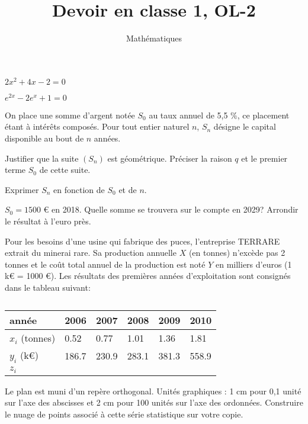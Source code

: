 \documentclass[a4paper,12pt]{scrartcl}
\date{}
\title{Devoir en classe 1, OL-2}
\author{Mathématiques}
\begin{document}
\maketitle


\question{}
$2x^2 +4x - 2 = 0$

\question{}
$e^{2x} - 2e^x + 1 = 0$


On place une somme d'argent notée $S_0$ au taux annuel de 5,5 \%, ce placement étant à intérêts composés.
Pour tout entier naturel $n$, $S_n$ désigne le capital disponible au bout de $n$ années.

\question{}
Justifier que la suite $(S_n)$ est géométrique. Préciser la raison $q$ et le premier terme $S_0$ de cette suite.

\question{}
Exprimer $S_n$ en fonction de $S_0$ et de $n$.

\question{}
$S_0 = 1500$ € en 2018. Quelle somme se trouvera sur le compte en 2029? Arrondir le résultat à l'euro près. 


Pour les besoins d'une usine qui fabrique des puces, l'entreprise TERRARE extrait du minerai rare. Sa production annuelle $X$ (en
tonnes) n'excède pas 2 tonnes et le coût total annuel de la production est noté $Y$ en milliers d'euros (1 k€ = 1000 €).
Les résultats des premières années d'exploitation sont consignés dans le tableau suivant:

\begin{table}[h]
\centering
\caption{}
\label{tableau_2}
\begin{tabular}{|l|l|l|l|l|l|}
\hline
année          & 2006  & 2007  & 2008  & 2009  & 2010  \\ \hline
$x_i$ (tonnes) & 0.52  & 0.77  & 1.01  & 1.36  & 1.81  \\ \hline
$y_i$ (k€)     & 186.7 & 230.9 & 283.1 & 381.3 & 558.9 \\ \hline
$z_i$&&&&& \\ \hline
\end{tabular}
\end{table}

\question{}
Le plan est muni d'un repère orthogonal.
Unités graphiques : 1 cm pour 0,1 unité sur l'axe des abscisses et 2 cm pour 100 unités sur l'axe des ordonnées.
Construire le nuage de points associé à cette série statistique sur votre copie. 
\end{document}
